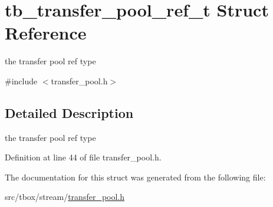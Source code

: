 \hypertarget{structtb__transfer__pool__ref__t}{\section{tb\-\_\-transfer\-\_\-pool\-\_\-ref\-\_\-t Struct Reference}
\label{structtb__transfer__pool__ref__t}
}


the transfer pool ref type  




{\ttfamily \#include $<$transfer\-\_\-pool.\-h$>$}



\subsection{Detailed Description}
the transfer pool ref type 

Definition at line 44 of file transfer\-\_\-pool.\-h.



The documentation for this struct was generated from the following file\-:\begin{DoxyCompactItemize}
\item 
src/tbox/stream/\hyperlink{transfer__pool_8h}{transfer\-\_\-pool.\-h}\end{DoxyCompactItemize}
